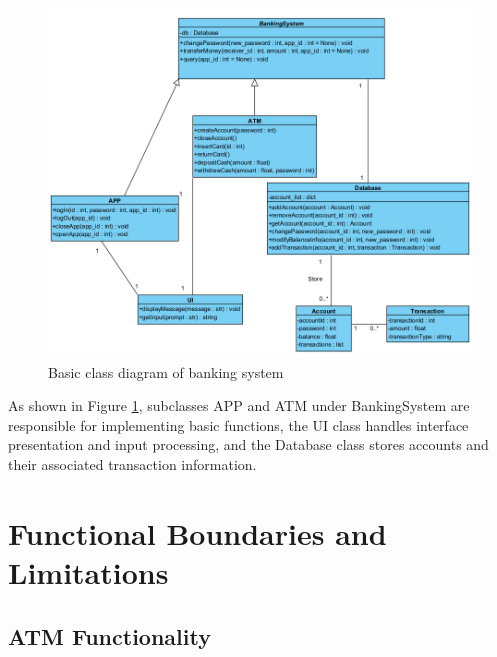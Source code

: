 \documentclass[12pt]{article}
\begin{document}
\begin{figure}[h]
    \centering
    \includegraphics[width=\linewidth]{WeeklyReport/class_diagram.png}
    \caption{Basic class diagram of banking system }
    \label{fig:classdiagram}
\end{figure}

As shown in Figure \ref{fig:classdiagram}, subclasses APP and ATM under BankingSystem are responsible for implementing basic functions, the UI class handles interface presentation and input processing, and the Database class stores accounts and their associated transaction information.
\newpage

\section{Functional Boundaries and Limitations}
\subsection{ATM Functionality}
\end{document}

